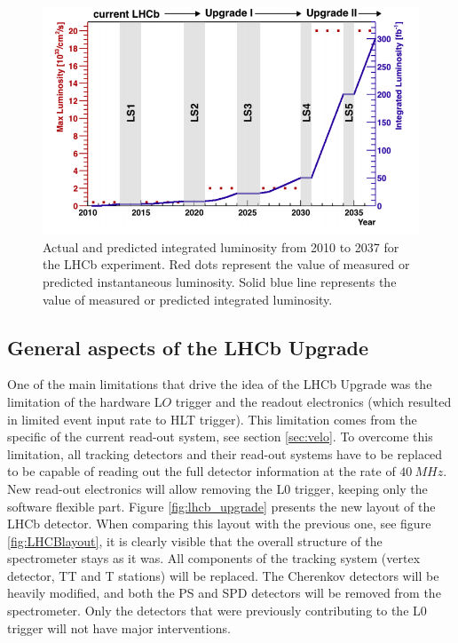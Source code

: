 \begin{figure}[!h]
\centering
\includegraphics[width=\linewidth]{figures/lhcb_lumi.PNG}
\caption{Actual and predicted integrated luminosity from 2010 to 2037 for the LHCb experiment. Red dots represent
the value of measured or predicted instantaneous luminosity. Solid blue line represents the value of measured or predicted integrated luminosity.
\label{fig:lhcb_lumi}}
\end{figure}


\subsection{General aspects of the LHCb Upgrade}

One of the main limitations that drive the idea of the LHCb Upgrade was the limitation of the hardware L$O$ trigger and the readout electronics (which resulted in limited event input rate to HLT trigger). This limitation comes from the specific of the current read-out system, see section \ref{sec:velo}.  To overcome this limitation, all tracking detectors and their read-out systems have to be replaced to be capable of reading out the full detector information at the rate of $40 ~MHz$. New read-out electronics will allow removing the L0 trigger, keeping only the software flexible part. Figure \ref{fig:lhcb_upgrade} presents the new layout of the LHCb detector. When comparing this layout with the previous one, see figure \ref{fig:LHCBlayout}, it is clearly visible that the overall structure of the spectrometer stays as it was. All components of the tracking system (vertex detector, TT and T stations) will be replaced. The Cherenkov detectors will be heavily modified, and both the PS and SPD detectors will be removed from the spectrometer. Only the detectors that were previously contributing to the L0 trigger will not have major interventions. 


